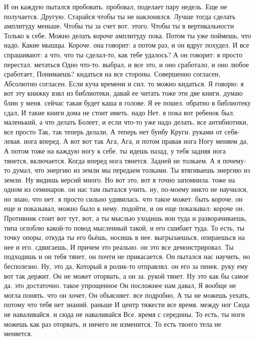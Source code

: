 И он каждую пытался пробовать. пробовал, поделает пару недель.
Еще не получается.
Другую.
Старайся чтобы ты не наклонялся.
Лучше тогда сделать амплитуду меньше.
Чтобы ты за счет вот.
этого.
Чтобы ты в вертикальности
Только к себе.
Можно делать короче амплитуду пока.
Потом ты уже поймешь, что надо.
Какие мышцы.
Короче. она говорит: а потом раз, и он вдруг похудел.
И все спрашивают: а что, что ты сделал-то, как тебе удалось?
А он говорит: я просто перестал.
метаться Одно что-то.
выбрал, и все это, и оно сработало, и оно любое сработает, Понимаешь?
кидаться на все стороны. Совершенно согласен, Абсолютно согласен.
Если куча времени и сил.
то можно кидаться. Я говорю: я вот эту книжку взял из библиотеки, давай ее читать тоже эти две книги. думаю блин у меня.
сейчас такая будет каша в голове. Я ее пошел.
обратно в библиотеку сдал, И такие книги дома не стоит иметь. надо Нет.
я пока вот ребенок был.
маленький, а что делать Болеет, и если что-то уже надо делать,
все антибиотики, все просто Так, так теперь делали, А теперь нет бунбу Круги.
руками от себя- левая.
нога вперед. А вот вот так Ага, Ага, и потом правая нога Ногу меняем да, А потом тоже на каждую ногу к себе.
ты идешь назад, у тебя задняя нога тянется, включается.
Когда вперед нога тянется.
Задней не толкаем.
А я почему-то думал, что энергию из земли мы передаем толками.
Ты втягиваешь энергию из земли.
Ну видишь версий много.
Но вот это, вот я точно запомнила.
тоже на одном из семинаров. он нас там пытался учить. ну, по-моему никто не научился, но знаю, что нет. я просто сильно удивилась.
что такое может.
быть короче. он еще и показывал, можно было к нему.
подойти, и он еще показывал: короче он.
Противник стоит вот тут, вот, а ты мыслью уходишь вон туда и разворачиваешь, типа оглоблю какой-то повод мысленный такой, и его сшибает туда. То есть, ты точку опоры, откуда ты его бьёшь, носишь в нее.
выгрызаешься, опираешься на нее и его.
сдвигаешь, И причем это реально. он это все демонстрировал. Ты подходишь и он тебя тянет, он почти не прикасается.
Он пытался нас научить, но бесполезно. Ну, это да, Который я ролик-то отправлял. он его за пенек. руку ему вот так держит. Он не может оторвать, а он за.
рукой тянет. Ну это как бы самое да. это достаточно. такое упрощенное Он посложнее нам давал, Я вообще не могла понять.
что он хочет, Он объясняет.
все подробно, А ты не можешь уехать, потому что
тебя нет знаний.
раньше И центр тяжести все время.
между ног Сюда не наваливайся.
и сюда не наваливайся Все.
время с середины.
То есть, ты ноги можешь как раз оторвать, и ничего не изменится.
То есть твоего тела не меняется.
